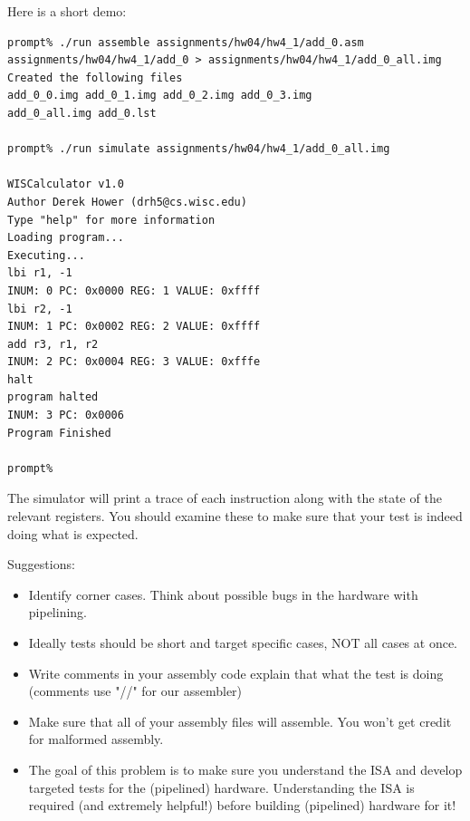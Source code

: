 \documentclass[12pt]{article}
\begin{document}
Here is a short demo:
\begin{lstlisting}[basicstyle=\ttfamily\small,breaklines=true]
prompt% ./run assemble assignments/hw04/hw4_1/add_0.asm assignments/hw04/hw4_1/add_0 > assignments/hw04/hw4_1/add_0_all.img
Created the following files
add_0_0.img add_0_1.img add_0_2.img add_0_3.img
add_0_all.img add_0.lst

prompt% ./run simulate assignments/hw04/hw4_1/add_0_all.img

WISCalculator v1.0
Author Derek Hower (drh5@cs.wisc.edu)
Type "help" for more information
Loading program...
Executing...
lbi r1, -1
INUM: 0 PC: 0x0000 REG: 1 VALUE: 0xffff
lbi r2, -1
INUM: 1 PC: 0x0002 REG: 2 VALUE: 0xffff
add r3, r1, r2
INUM: 2 PC: 0x0004 REG: 3 VALUE: 0xfffe
halt
program halted
INUM: 3 PC: 0x0006
Program Finished

prompt%

\end{lstlisting}

The simulator will print a trace of each instruction along with the state of the relevant registers. You should
examine these to make sure that your test is indeed doing what is expected.

Suggestions:
\begin{itemize}
\item Identify corner cases. Think about possible bugs in the hardware with pipelining.
\item Ideally tests should be short and target specific cases, NOT all cases at once.
\item Write comments in your assembly code explain that what the test is doing (comments use "//" for
our assembler)
\item Make sure that all of your assembly files will assemble. You won't get credit for malformed
assembly.
\item The goal of this problem is to make sure you understand the ISA and develop targeted tests for the
(pipelined) hardware. Understanding the ISA is required (and extremely helpful!) before building
(pipelined) hardware for it!
\end{itemize}
\end{document}
